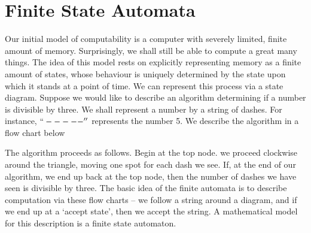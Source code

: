 \chapter{Finite State Automata}

Our initial model of computability is a computer with severely limited, finite amount of memory. Surprisingly, we shall still be able to compute a great many things. The idea of this model rests on explicitly representing memory as a finite amount of states, whose behaviour is uniquely determined by the state upon which it stands at a point of time. We can represent this process via a state diagram. Suppose we would like to describe an algorithm determining if a number is divisible by three. We shall represent a number by a string of dashes. For instance, $``-----''$ represents the number 5. We describe the algorithm in a flow chart below
%
\begin{center}
\end{center}
%
The algorithm proceeds as follows. Begin at the top node. we proceed clockwise around the triangle, moving one spot for each dash we see. If, at the end of our algorithm, we end up back at the top node, then the number of dashes we have seen is divisible by three. The basic idea of the finite automata is to describe computation via these flow charts -- we follow a string around a diagram, and if we end up at a `accept state', then we accept the string. A mathematical model for this description is a finite state automaton.

